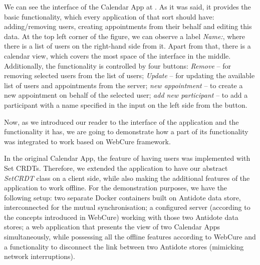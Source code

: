 We can see the interface of the Calendar App at . As it was said, it provides the basic functionality, which every application of that sort should have: adding/removing users, creating appointments from their behalf and editing this data. At the top left corner of the figure, we can observe a label \textit{Name:}, where there is a list of users on the right-hand side from it. Apart from that, there is a calendar view, which covers the most space of the interface in the middle. Additionally, the functionality is controlled by four buttons: \textit{Remove} -- for removing selected users from the list of users; \textit{Update} -- for updating the available list of users and appointments from the server; \textit{new appointment} -- to create a new appointment on behalf of the selected user; \textit{add new participant} -- to add a participant with a name specified in the input on the left side from the button. 

Now, as we introduced our reader to the interface of the application and the functionality it has, we are going to demonstrate how a part of its functionality was integrated to work based on WebCure framework. 

In the original Calendar App, the feature of having users was implemented with Set CRDTs. Therefore, we extended the application to have our abstract \textit{SetCRDT} class on a client side, while also making the additional features of the application to work offline. For the demonstration purposes, we have the following setup: two separate Docker containers built on Antidote data store, interconnected for the mutual synchronisation; a configured server (according to the concepts introduced in WebCure) working with those two Antidote data stores; a web application that presents the view of two Calendar Apps simultaneously, while possessing all the offline features according to WebCure and a functionality to disconnect the link between two Antidote stores (mimicking network interruptions). 

